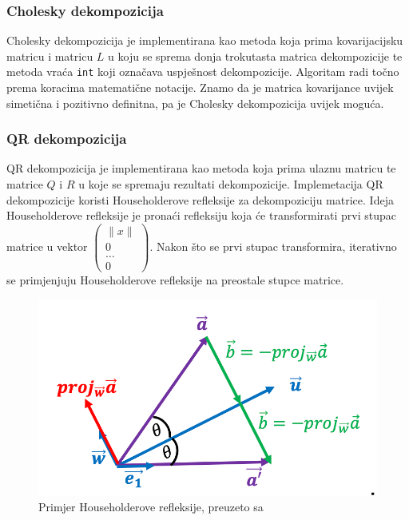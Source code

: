 \documentclass[zavrsnirad, upload]{fer}
\begin{document}
\subsubsection{Cholesky dekompozicija}
\label{sek:cholesky_dekompozicija}
Cholesky dekompozicija je implementirana
kao metoda koja prima kovarijacijsku matricu i matricu $L$ u koju se sprema
donja trokutasta matrica dekompozicije te metoda vraća \texttt{int} koji
označava uspješnost dekompozicije.
Algoritam radi točno prema koracima matematične notacije.
Znamo da je matrica kovarijance uvijek simetična i
pozitivno definitna, pa je Cholesky dekompozicija uvijek moguća.

\subsubsection{QR dekompozicija}
\label{sek:qr_dekompozicija}
QR dekompozicija je implementirana kao metoda koja prima ulaznu matricu
te matrice $Q$ i $R$ u koje se spremaju rezultati dekompozicije.
Implemetacija QR dekompozicije koristi Householderove refleksije za
dekompoziciju matrice. Ideja Householderove refleksije je pronaći
refleksiju koja će transformirati prvi stupac matrice u vektor
$\begin{pmatrix} \|x\| \\ 0 \\ \dots \\ 0 \end{pmatrix}$.
Nakon što se prvi stupac transformira, iterativno se primjenjuju
Householderove refleksije na preostale stupce matrice.

\begin{figure}[H]
    \centering
    \includegraphics[width=1.0\textwidth]{Figures/householder.png}
    \caption{Primjer Householderove refleksije, preuzeto sa \cite{HouseholderSketch}}
    \label{fig:householder}
\end{figure}
\end{document}
